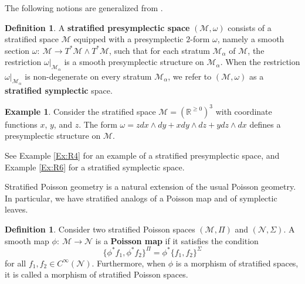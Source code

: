 \documentclass[12pt]{amsart}
\theoremstyle{definition}
\newtheorem{definition}[theorem]{Definition}
\newtheorem{example}[theorem]{Example}
\numberwithin{equation}{section}
\newcommand{\Cinf}{C^\infty}
\newcommand{\PoissonBracket}[1]{\{#1\}}
\begin{document}
The following notions are generalized from \cite{Pflaumpaper,anotherpaper}.

\begin{definition}\label{def:presymlecticstratifiedspace}
		A \textbf{stratified presymplectic space} $(\mathcal{M},\omega)$ consists of a stratified space $ \mathcal{M} $ equipped with a presymplectic $2$-form $\omega$,  namely a smooth section $\omega:~\mathcal{M}\to T^*\mathcal{M}\wedge T^*\mathcal{M}$, such that for each stratum $\mathcal{M}_{\alpha}$   of $\mathcal{M}$, the restriction $\omega|_{\mathcal{M}_{\alpha}}$ is a smooth presymplectic structure on $\mathcal{M}_{\alpha}$.   When the restriction $\omega|_{\mathcal{M}_{\alpha}}$ is   non-degenerate on every   stratum $\mathcal{M}_{\alpha}$,   we   refer to $(\mathcal{M},\omega)$ as a   \textbf{stratified symplectic} space.
		
	\end{definition}

	
	
\begin{example}Consider the stratified space $\mathcal{M} =(\mathbb{R}^{\geqslant 0})^3$ with coordinate functions $x$, $y$, and $z$.  The form $\omega=z dx\wedge dy+ x dy\wedge dz + y dz\wedge dx$ defines a presymplectic structure on $\mathcal{M} $. 
\end{example}	

See Example \ref{Ex:R4} for an example  of a    stratified presymplectic space, and Example \ref{Ex:R6} for a   stratified symplectic space.
 

	Stratified Poisson geometry is a natural extension of the usual Poisson geometry. In particular, we have stratified analogs of a Poisson map and of symplectic leaves. 
	
	\begin{definition}
		
		
		Consider two stratified Poisson spaces $(\mathcal{M},\Pi)$ and $(\mathcal{N},\Sigma)$. A smooth map $\phi:~ \mathcal{M} \to  \mathcal{N}$ is  a  \textbf{Poisson map}  if it satisfies the condition $$\PoissonBracket{\phi^*f_1,\phi^*f_2}^{\Pi}=\phi^*\PoissonBracket{f_1,f_2}^{\Sigma}$$ for all $f_1,f_2\in \Cinf(\mathcal{N})$. Furthermore, when $\phi$ is a  morphism   of stratified spaces, it is called a  morphism  of stratified Poisson spaces.
		
		
		
	\end{definition}
	
 
	
\end{document}
